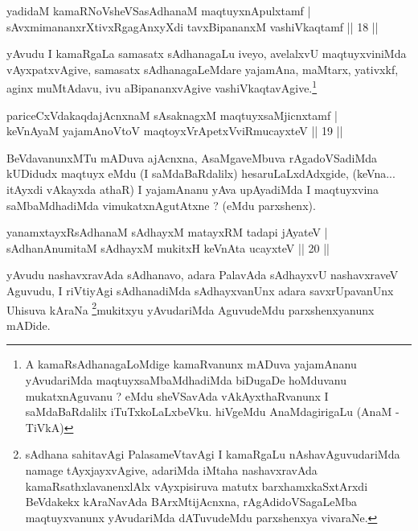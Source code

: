 
\begin{shl}
yadidaM kamaRNoV\s sheVSasAdhanaM maqtuyxnA\s \s pulxtamf |\\
sAvxmimananxrXtivxRgagAnxyXdi tavxBipananxM vashiVkaqtamf \hfill || 18 ||
\end{shl}

\begin{artha}
yAvudu I kamaRgaLa samasatx sAdhanagaLu iveyo, avelalxvU maqtuyx\-viniMda vAyxpatxvAgive, samasatx sAdhanagaLeMdare yajamAna, maMtarx, yativxkf, aginx muMtAdavu, ivu aBipananxvAgive vashiVkaqtavAgive.\footnote[3]{A kamaRsAdhanagaLoMdige kamaRvanunx mADuva yajamAnanu yAvudariMda maqtuyxsaMbaMdhadiMda biDugaDe hoMduvanu mukatxnAguvanu ? eMdu sheVSavAda vAkAyxthaRvanunx I \-saMdaBaRdalilx iTuTxkoLaLxbeVku. hiVgeMdu AnaMdagirigaLu (AnaM - TiVkA)}
\end{artha}


\begin{shl}
pariceCxVdakaqdajAcnxnaM sAsaknagxM maqtuyxsaMjicnxtamf |\\
keVnAyaM yajamAnoV\s toV maqtoyxVrApetxVviRmucayxteV \hfill || 19 ||
\end{shl}

\begin{artha}
BeVdavanunxMTu mADuva ajAcnxna, AsaMgaveMbuva rAgadoVSadiMda kUDidudx maqtuyx eMdu (I saMdaBaRdalilx) hesaruLaLxdAdxgide, (keVna... itAyxdi vAkayxda athaR) I yajamAnanu yAva upAyadiMda I maqtuyxvina saMbaMdhadiMda vimukatxnAgutAtxne ? (eMdu parxshenx).
\end{artha}


\begin{shl}
yanamxtayxRsAdhanaM sAdhayxM matayxRM tadapi jAyateV |\\
sAdhanAnumitaM sAdhayxM mukitxH keVnAta ucayxteV \hfill || 20 ||
\end{shl}

\begin{artha}
yAvudu nashavxravAda sAdhanavo, adara PalavAda sAdhayxvU nashavxraveV Aguvudu, I riVtiyAgi sAdhanadiMda sAdhayxvanUnx adara savxrUpavanUnx Uhisuva kAraNa \footnote[1]{sAdhana sahitavAgi PalasameVtavAgi I kamaRgaLu nAshavAguvudariMda namage tAyxjayxvAgive, adariMda iMtaha nashavxravAda kamaRsathxlavanenxlAlx vAyxpisiruva matutx barxhamxkaSxtArxdi BeVdakekx kAraNavAda BArxMtijAcnxna, rAgAdidoVSagaLeMba maqtuyxvanunx yAvudariMda dATuvudeMdu parxshenxya vivaraNe.}mukitxyu yAvudariMda AguvudeMdu parxshenxyanunx mADide.
\end{artha}

